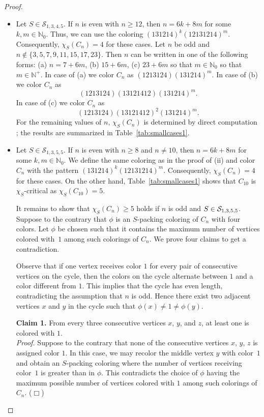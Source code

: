 \documentclass[12pt]{article}
\newcommand{\smallqed}{{\tiny ($\Box$)}}
\newcommand{\cS}{{\cal S}}
\begin{document}
\begin{proof}
\begin{itemize}
		\item[$(ii)$] Let $S \in \mathcal{S}_{1,3,4,5}$. %
		If  $n$ is even with $n \geq 12$, then $n= 6k+8m$ for some $k,m \in \mathbb{N}_{0}$. Thus, we can use the coloring $(131214)^{k}(12131214)^m.$  Consequently, $\chi_S(C_n)=4$ for these cases. Let $n$ be odd and $n \notin \{3, 5, 7, 9, 11, 15, 17, 23\}$. Then $n$ can be written in one of the following forms: (a) $n=7+6m$, (b) $15+6m$, (c) $23+6m$ so that $m \in \mathbb{N}_{0}$  so that $m \in \mathbb{N}^+$. In case of (a) we color $C_n$ as $(1213124)(131214)^m.$ In case of (b) we color $C_n$ as \[ (1213124)(13121412)(131214)^m.\] In case of (c) we color $C_n$ as  \[(1213124)(13121412)^2(131214)^m.\]
        For the remaining values of $n$,  
		$\chi_S(C_n)$ is determined by direct computation \cite{Spackingtool}; the results are summarized in 
		Table~\ref{tab:smallcases1}.   
		
		\item[$(iii)$] 
		Let $S \in \mathcal{S}_{1,3,5,5}$. If  $n$ is even with $n \geq 8$ and $n\neq 10$, then $n= 6k+8m$ for some $k,m \in \mathbb{N}_{0}$. We define the same coloring as in the proof of (ii) and color $C_n$ with the pattern $(131214)^{k}(12131214)^m.$  Consequently, $\chi_S(C_n)=4$ for these cases. On the other hand, Table~\ref{tab:smallcases1} shows that $C_{10}$ is $\chi_S$-critical as $\chi_S(C_{10})=5$.

It remains to show that $\chi_S(C_n)\ge 5$ holds if $n $ is odd and $S \in \cS_{1,3,5,5}$. Suppose to the contrary that $\phi$ is an $S$-packing coloring of $C_n$ with four colors. Let $\phi$ be chosen such that it contains the maximum number of vertices colored with~$1$ among such colorings of $C_n$. We prove four claims to get a contradiction.

Observe that if one vertex receives color $1$ for every pair of consecutive vertices on the cycle, then the colors on the cycle alternate between $1$ and a color different from $1$. This implies that the cycle has even length, contradicting the assumption that $n$ is odd. Hence there exist two adjacent vertices $x$ and $y$ in the cycle such that $\phi(x) \neq 1 \neq \phi(y)$. 

\textbf{Claim 1.} From every three consecutive vertices $x$, $y$, and $z$, at least one is colored with $1$. \\
   \noindent \textit{Proof.}
  Suppose to the contrary that none of the consecutive vertices $x$, $y$, $z$ is assigned color $1$.  In this case, we may recolor the middle vertex $y$ with color~$1$  and obtain an $S$-packing coloring where the number of vertices receiving color~$1$ is greater than in $\phi$. This contradicts the choice of $\phi$ having the maximum possible number of vertices colored with $1$ among such colorings of $C_n$. \smallqed


\end{itemize}
\end{proof}
\end{document}
